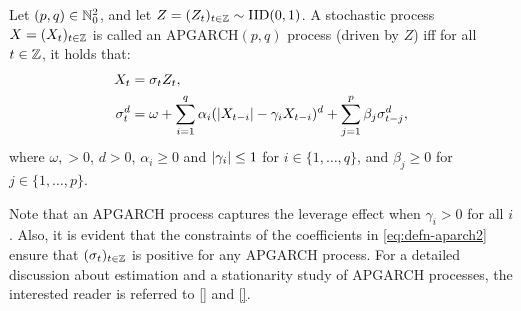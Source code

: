 

\begin{defn}
Let $(p,q)\in\mathbb{N}_{0}^{2}$, and let $Z=(Z_{t})_{t\in\mathbb{Z}}\sim\mathrm{IID}(0,1)$. A stochastic process $X=(X_{t})_{t\in\mathbb{Z}}$ is called an $\mathrm{APGARCH}(p,q)$ process (driven by $Z$) iff for all $t\in\mathbb{Z}$, it holds that:
\begin{subequations}\label{eq:defn-aparch}
\begin{align}
    X_{t}&=\sigma_{t}Z_{t}, \label{eq:defn-aparch1}\\
    \sigma_{t}^{d}&=\omega+\sum_{i=1}^{q}\alpha_{i}(\lvert X_{t-i}\rvert-\gamma_{i} X_{t-i})^{d}+\sum_{j=1}^{p}\beta_{j}\sigma_{t-j}^{d}\label{eq:defn-aparch2},
\end{align}
\end{subequations}
where $\omega,>0$, $d>0$, $\alpha_{i}\geq0$ and $\lvert\gamma_{i}\rvert\leq 1$ for $i\in\{1,\dots,q\}$, and $\beta_{j}\geq0$ for $j\in\{1,\dots,p\}$.
\end{defn}
Note that an APGARCH process captures the leverage effect when $\gamma_{i}>0$ for all $i$. Also, it is evident that the constraints of the coefficients in \eqref{eq:defn-aparch2} ensure that $(\sigma_{t})_{t\in\mathbb{Z}}$ is positive for any APGARCH process. For a detailed discussion about estimation and a stationarity study of APGARCH processes, the interested reader is referred to \ref{} and \ref{}. %

